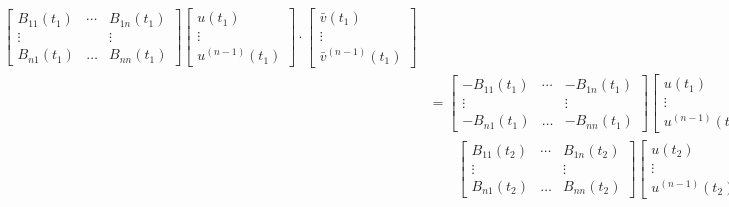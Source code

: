 \documentclass[10.5pt, oneside, a4paper]{article}
\begin{document}
\begin{rmk}
{\begin{equation}
\begin{split}
\begin{bmatrix}
            B_{11}(t_1) & \cdots & B_{1n}(t_1)\\
            \vdots &  & \vdots\\
            B_{n1}(t_1) & \ldots & B_{nn}(t_1)
        \end{bmatrix} 
        \begin{bmatrix}
        u(t_1)\\
        \vdots\\
        u^{(n-1)}(t_1)
        \end{bmatrix}\cdot 
        \begin{bmatrix}
            \bar{v}(t_1)\\
            \vdots\\
            \bar{v}^{(n-1)}(t_1)
        \end{bmatrix}\\
        &= \begin{bmatrix}
            -B_{11}(t_1) & \cdots & -B_{1n}(t_1)\\
            \vdots &  & \vdots\\
            -B_{n1}(t_1) & \ldots & -B_{nn}(t_1)
        \end{bmatrix} 
        \begin{bmatrix}
        u(t_1)\\
        \vdots\\
        u^{(n-1)}(t_1)
        \end{bmatrix}\cdot 
        \begin{bmatrix}
            \bar{v}(t_1)\\
            \vdots\\
            \bar{v}^{(n-1)}(t_1)
        \end{bmatrix} + \\
        &\qquad \begin{bmatrix}
            B_{11}(t_2) & \cdots & B_{1n}(t_2)\\
            \vdots &  & \vdots\\
            B_{n1}(t_2) & \ldots & B_{nn}(t_2)
        \end{bmatrix} 
        \begin{bmatrix}
        u(t_2)\\
        \vdots\\
        u^{(n-1)}(t_2)
        \end{bmatrix}\cdot 
        \begin{bmatrix}
            \bar{v}(t_2)\\
            \vdots\\

\end{bmatrix}
\end{split}
\end{equation}}
\end{rmk}
\end{document}
